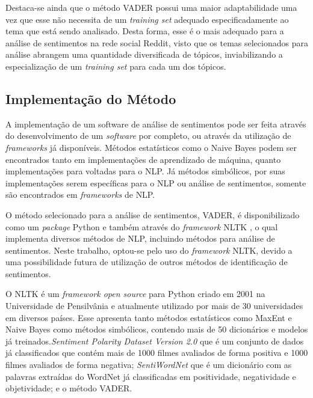 Destaca-se ainda que o método \ac{VADER} possui uma maior
adaptabilidade uma vez que esse não necessita de um \textit{training set}
adequado especificadamente ao tema que está sendo analisado. Desta forma,
esse é o mais adequado para a análise de sentimentos na rede social Reddit,
visto que os temas selecionados para análise abrangem uma quantidade diversificada de tópicos, inviabilizando a especialização de um
\textit{training set} para cada um dos tópicos.

\subsection{Implementação do Método}

A implementação de um software de análise de sentimentos pode ser feita através
do desenvolvimento de um \textit{software} por completo, ou através da
utilização de \textit{frameworks} já disponíveis.
Métodos estatísticos como o Naive Bayes podem ser encontrados tanto em implementações de
aprendizado de máquina, quanto implementações para voltadas para o \ac{NLP}.
Já métodos simbólicos, por suas implementações serem específicas para o
\ac{NLP} ou análise de sentimentos, somente são encontrados em
\textit{frameworks} de \ac{NLP}.

O método selecionado para a análise de sentimentos, \ac{VADER}, é
disponibilizado como um \textit{package} Python e também através do
\textit{framework} \ac{NLTK} \cite{Loper:2002:NNL:1118108.1118117}, o qual
implementa diversos métodos de \ac{NLP}, incluindo métodos para análise de
sentimentos. Neste trabalho, optou-se pelo uso do \textit{framework} \ac{NLTK},
devido a uma possibilidade futura de utilização de outros métodos de
identificação de sentimentos.

O \ac{NLTK} é um \textit{framework open source} para Python
criado em 2001 na Universidade de Pensilvânia e atualmente utilizado por mais de
30 universidades em diversos
países\cite{nltk}.
Esse apresenta tanto métodos estatísticos como \ac{MaxEnt} e Naive Bayes como métodos simbólicos, contendo
mais de 50 dicionários e modelos já treinados.\textit{Sentiment Polarity
Dataset Version 2.0} que é um conjunto de dados já classificados que contém mais
de 1000 filmes avaliados de forma positiva e 1000 filmes avaliados de forma
negativa; \textit{SentiWordNet} que é um dicionário com as palavras extraídas do
WordNet já classificadas em positividade, negatividade e objetividade; e o
método \ac{VADER}.
